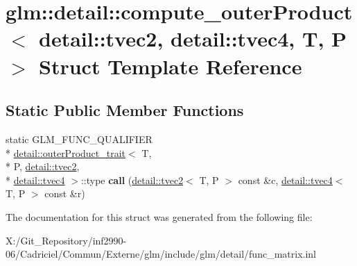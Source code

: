 \hypertarget{structglm_1_1detail_1_1compute__outer_product_3_01detail_1_1tvec2_00_01detail_1_1tvec4_00_01_t_00_01_p_01_4}{\section{glm\-:\-:detail\-:\-:compute\-\_\-outer\-Product$<$ detail\-:\-:tvec2, detail\-:\-:tvec4, T, P $>$ Struct Template Reference}
\label{structglm_1_1detail_1_1compute__outer_product_3_01detail_1_1tvec2_00_01detail_1_1tvec4_00_01_t_00_01_p_01_4}
}
\subsection*{Static Public Member Functions}
\begin{DoxyCompactItemize}
\item 
\hypertarget{structglm_1_1detail_1_1compute__outer_product_3_01detail_1_1tvec2_00_01detail_1_1tvec4_00_01_t_00_01_p_01_4_ad90103f96c934d52467d8e9fe2525e7b}{static G\-L\-M\-\_\-\-F\-U\-N\-C\-\_\-\-Q\-U\-A\-L\-I\-F\-I\-E\-R \\*
\hyperlink{structglm_1_1detail_1_1outer_product__trait}{detail\-::outer\-Product\-\_\-trait}$<$ T, \\*
P, \hyperlink{structglm_1_1detail_1_1tvec2}{detail\-::tvec2}, \\*
\hyperlink{structglm_1_1detail_1_1tvec4}{detail\-::tvec4} $>$\-::type {\bfseries call} (\hyperlink{structglm_1_1detail_1_1tvec2}{detail\-::tvec2}$<$ T, P $>$ const \&c, \hyperlink{structglm_1_1detail_1_1tvec4}{detail\-::tvec4}$<$ T, P $>$ const \&r)}\label{structglm_1_1detail_1_1compute__outer_product_3_01detail_1_1tvec2_00_01detail_1_1tvec4_00_01_t_00_01_p_01_4_ad90103f96c934d52467d8e9fe2525e7b}

\end{DoxyCompactItemize}


The documentation for this struct was generated from the following file\-:\begin{DoxyCompactItemize}
\item 
X\-:/\-Git\-\_\-\-Repository/inf2990-\/06/\-Cadriciel/\-Commun/\-Externe/glm/include/glm/detail/func\-\_\-matrix.\-inl\end{DoxyCompactItemize}
